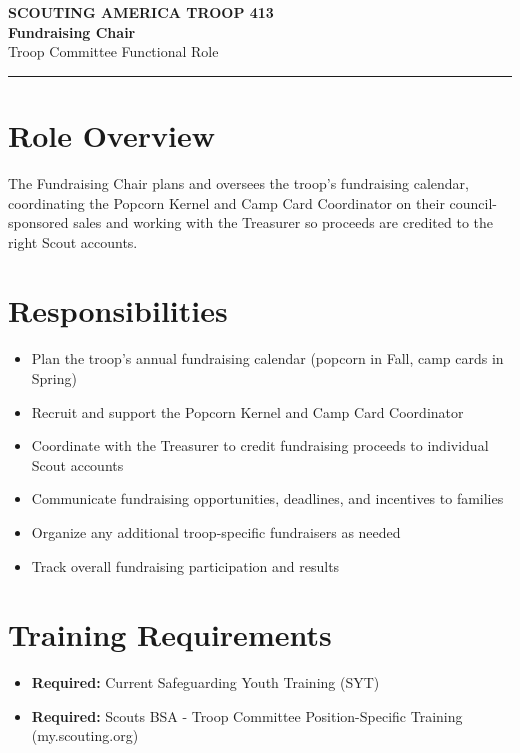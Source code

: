 \documentclass[11pt, letterpaper]{article}
\begin{document}
\begin{center}
  {\small\color{scoutgreen}\textbf{SCOUTING AMERICA \textbullet{} TROOP 413}} \\[4pt]
  {\fontsize{20pt}{24pt}\selectfont\bfseries\color{scoutgreen} Fundraising Chair} \\[4pt]
  {\large\color{accent} Troop Committee \textbullet{} Functional Role} \\[4pt]
  \textcolor{accent}{\rule{0.6\linewidth}{1pt}}
\end{center}

\vspace{0.3em}

\begin{minipage}[t]{0.48\linewidth}
\raggedright

\section{Role Overview}
The Fundraising Chair plans and oversees the troop's fundraising calendar, coordinating the Popcorn Kernel and Camp Card Coordinator on their council-sponsored sales and working with the Treasurer so proceeds are credited to the right Scout accounts.

\vspace{0.4em}
\section{Responsibilities}
\begin{itemize}
  \item Plan the troop's annual fundraising calendar (popcorn in Fall, camp cards in Spring)
  \item Recruit and support the Popcorn Kernel and Camp Card Coordinator
  \item Coordinate with the Treasurer to credit fundraising proceeds to individual Scout accounts
  \item Communicate fundraising opportunities, deadlines, and incentives to families
  \item Organize any additional troop-specific fundraisers as needed
  \item Track overall fundraising participation and results
\end{itemize}

\section{Training Requirements}
\begin{itemize}
  \item \textbf{Required:} Current Safeguarding Youth Training (SYT)
  \item \textbf{Required:} Scouts BSA - Troop Committee Position-Specific Training (my.scouting.org)
\end{itemize}

\end{minipage}
\end{document}
